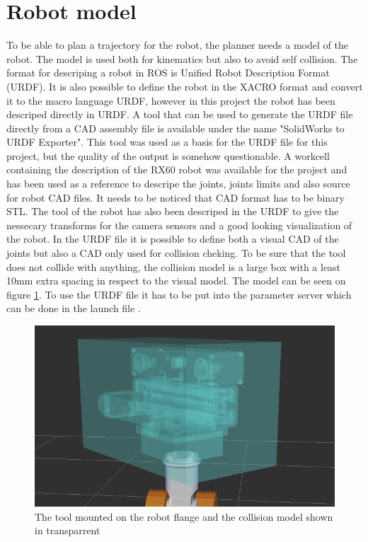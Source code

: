 \section{Robot model}
\label{sec:robot_model}
To be able to plan a trajectory for the robot, the planner needs a model of the robot. The model is used both for kinematics but also to avoid self collision. The format for descriping a robot in ROS is Unified Robot Description Format (URDF). It is also possible to define the robot in the XACRO format and convert it to the macro language URDF, however in this project the robot has been descriped directly in URDF.
A tool that can be used to generate the URDF file directly from a CAD assembly file is available under the name "SolidWorks to URDF Exporter". This tool was used as a basis for the URDF file for this project, but the quality of the output is somehow questionable. A workcell containing the description of the RX60 robot was available for the project and has been used as a reference to descripe the joints,  joints limits and also source for robot CAD files. It needs to be noticed that CAD format has to be binary STL. The tool of the robot has also been descriped in the URDF to give the nessecary transforms for the camera sensors and a good looking visualization of the robot. In the URDF file it is possible to define both a visual CAD of the joints but also a CAD only used for collision cheking. To be sure that the tool does not collide with anything, the collision model is a large box with a least 10mm extra spacing in respect to the visual model. The model can be seen on figure \ref{fig:tool_collision_model}. To use the URDF file it has to be put into the parameter server which can be done in the launch file .

\begin{figure}[htb]
	\begin{center}
		\includegraphics[scale=0.5,trim=0 0 0 0]{graphics/05_robotics/tool_collision_model.png}%
		\caption{The tool mounted on the robot flange and the collision model shown in transparrent}
		\label{fig:tool_collision_model}
	\end{center}
\end{figure}

